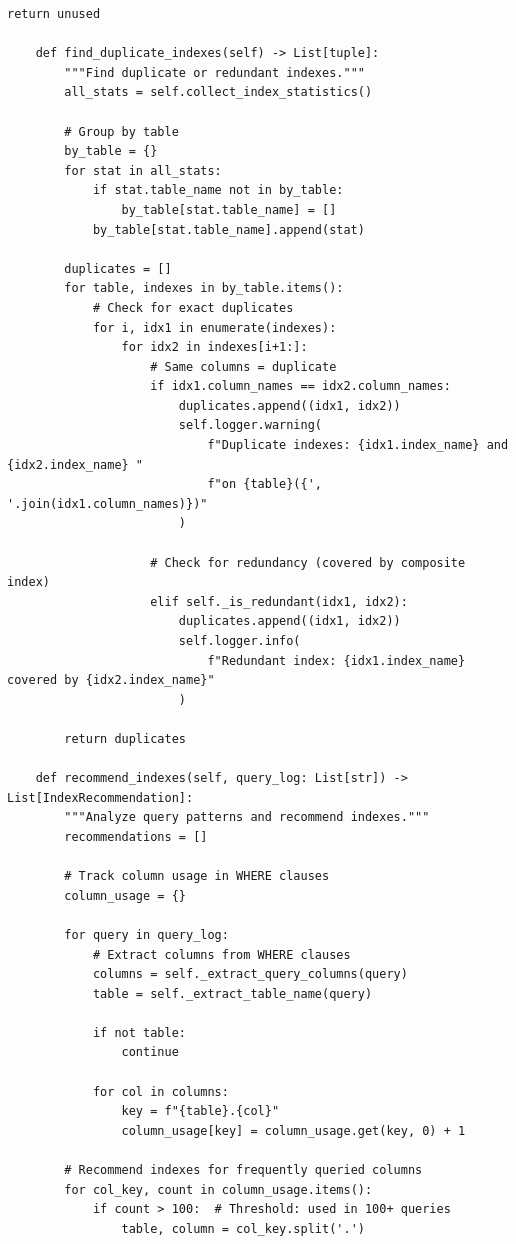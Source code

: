 \begin{lstlisting}[style=python, caption=IndexManager with Smart Recommendations]
        return unused

    def find_duplicate_indexes(self) -> List[tuple]:
        """Find duplicate or redundant indexes."""
        all_stats = self.collect_index_statistics()

        # Group by table
        by_table = {}
        for stat in all_stats:
            if stat.table_name not in by_table:
                by_table[stat.table_name] = []
            by_table[stat.table_name].append(stat)

        duplicates = []
        for table, indexes in by_table.items():
            # Check for exact duplicates
            for i, idx1 in enumerate(indexes):
                for idx2 in indexes[i+1:]:
                    # Same columns = duplicate
                    if idx1.column_names == idx2.column_names:
                        duplicates.append((idx1, idx2))
                        self.logger.warning(
                            f"Duplicate indexes: {idx1.index_name} and {idx2.index_name} "
                            f"on {table}({', '.join(idx1.column_names)})"
                        )

                    # Check for redundancy (covered by composite index)
                    elif self._is_redundant(idx1, idx2):
                        duplicates.append((idx1, idx2))
                        self.logger.info(
                            f"Redundant index: {idx1.index_name} covered by {idx2.index_name}"
                        )

        return duplicates

    def recommend_indexes(self, query_log: List[str]) -> List[IndexRecommendation]:
        """Analyze query patterns and recommend indexes."""
        recommendations = []

        # Track column usage in WHERE clauses
        column_usage = {}

        for query in query_log:
            # Extract columns from WHERE clauses
            columns = self._extract_query_columns(query)
            table = self._extract_table_name(query)

            if not table:
                continue

            for col in columns:
                key = f"{table}.{col}"
                column_usage[key] = column_usage.get(key, 0) + 1

        # Recommend indexes for frequently queried columns
        for col_key, count in column_usage.items():
            if count > 100:  # Threshold: used in 100+ queries
                table, column = col_key.split('.')


\end{lstlisting}
